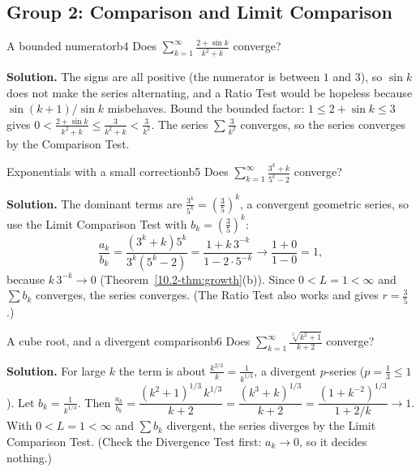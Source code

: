 \documentclass[11pt]{article}
\begin{document}
\subsection*{Group 2: Comparison and Limit Comparison}

\begin{exmp}{A bounded numerator}{b4}
Does $\displaystyle\sum_{k=1}^\infty\frac{2+\sin k}{k^2+k}$ converge?

\textbf{Solution.} The signs are all positive (the numerator is between $1$ and $3$), so $\sin k$ does not make the series alternating, and a Ratio Test would be hopeless because $\sin(k+1)/\sin k$ misbehaves. Bound the bounded factor: $1\le2+\sin k\le3$ gives $0<\frac{2+\sin k}{k^2+k}\le\frac3{k^2+k}<\frac3{k^2}$. The series $\sum\frac3{k^2}$ converges, so the series converges by the Comparison Test.
\end{exmp}

\begin{exmp}{Exponentials with a small correction}{b5}
Does $\displaystyle\sum_{k=1}^\infty\frac{3^k+k}{5^k-2}$ converge?

\textbf{Solution.} The dominant terms are $\frac{3^k}{5^k}=\left(\frac35\right)^k$, a convergent geometric series, so use the Limit Comparison Test with $b_k=\left(\frac35\right)^k$:
\[
\frac{a_k}{b_k}=\frac{\left(3^k+k\right)5^k}{3^k\left(5^k-2\right)}=\frac{1+k\,3^{-k}}{1-2\cdot5^{-k}}\to\frac{1+0}{1-0}=1,
\]
because $k\,3^{-k}\to0$ (Theorem~\ref{10.2-thm:growth}(b)). Since $0<L=1<\infty$ and $\sum b_k$ converges, the series converges. (The Ratio Test also works and gives $r=\frac35$.)
\end{exmp}

\begin{exmp}{A cube root, and a divergent comparison}{b6}
Does $\displaystyle\sum_{k=1}^\infty\frac{\sqrt[3]{k^2+1}}{k+2}$ converge?

\textbf{Solution.} For large $k$ the term is about $\frac{k^{2/3}}k=\frac1{k^{1/3}}$, a divergent $p$-series ($p=\frac13\le1$). Let $b_k=\frac1{k^{1/3}}$. Then $\frac{a_k}{b_k}=\dfrac{(k^2+1)^{1/3}\,k^{1/3}}{k+2}=\dfrac{(k^3+k)^{1/3}}{k+2}=\dfrac{\left(1+k^{-2}\right)^{1/3}}{1+2/k}\to1$. With $0<L=1<\infty$ and $\sum b_k$ divergent, the series diverges by the Limit Comparison Test. (Check the Divergence Test first: $a_k\to0$, so it decides nothing.)
\end{exmp}
\end{document}
